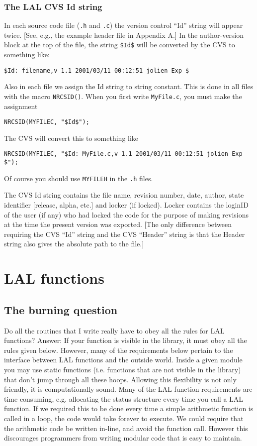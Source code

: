 \documentclass[]{ligodcc}
\begin{document}
\subsubsection{The LAL CVS Id string}

In each source code file ({\tt .h} and  {\tt .c}) the version control ``Id''
string will appear  twice.  [See, e.g., the example header file in
Appendix A.] In the author-version block at the top of the file, the
string {\tt \$\relax Id\$} will be converted 
by the CVS to something like:

\noindent
{\tt \$\relax Id: filename,v 1.1 2001/03/11 00:12:51 jolien Exp \$}

\noindent
Also in each file we assign the Id string to string constant. This is
done in all files with the macro 
{\tt NRCSID()}.  When you first write {\tt MyFile.c},  you must make the assignment  

\noindent
{\tt NRCSID(MYFILEC, "\$\relax Id\$");} 

\noindent
The CVS will convert this to something like

\noindent
{\tt NRCSID(MYFILEC, "\$\relax Id: MyFile.c,v 1.1 2001/03/11 00:12:51 jolien Exp \$");}

\noindent
Of course you should use {\tt MYFILEH} in the {\tt .h} files.

The  CVS Id  string contains the  file name, revision number, date,
author, state identifier [release, alpha, etc.] and locker (if
locked). Locker contains the loginID of the user (if any) who had
locked the code for the purpose of making revisions at the time the
present version was exported. [The only difference between requiring
the CVS  ``Id'' string and the CVS ``Header'' string is that the Header
string also gives the absolute path to the file.]

\section{LAL functions}
\label{sec:lalfunctions}
\subsection{The burning question}

Do all the routines that I write really have to obey all the  rules
for LAL functions? Answer: If your function is visible in the library,
it must obey all the rules given below.  However, many of the
requirements below pertain to the interface between LAL functions and
the outside world. Inside a given module you may use static functions
(i.e. functions that are not visible in the library) that don't jump
through all these hoops.  Allowing this flexibility is not only
friendly, it is computationally sound. Many of the LAL function
requirements are time consuming, e.g. allocating the status
structure every time you call a LAL function. If we required this to
be done every time a simple arithmetic function is called in a loop,
the code would take forever to execute. We could require that the
arithmetic code be written in-line, and avoid the function call.
However this discourages programmers from writing  modular code that
is easy to maintain.
\end{document}
